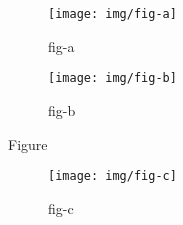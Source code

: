 \begin{figure}[!htb] 
    \begin{subfigure}[!htb]{\textwidth}
        \centering
        \texttt{[image: img/fig-a]}
        \caption{fig-a\\\hspace{\textwidth}}\label{fig:fig-a}
    \end{subfigure}
    \begin{subfigure}[!htb]{\textwidth}
        \centering
        \texttt{[image: img/fig-b]}
        \caption{fig-b\\}\label{fig:fig-b}
    \end{subfigure}
    \caption{Figure}
    \label{fig:fig}
\end{figure}
\begin{figure}[!htb]\ContinuedFloat    
    \begin{subfigure}[!htb]{\textwidth}
        \centering
        \texttt{[image: img/fig-c]}
        \caption{fig-c}\label{fig:fig-c}
    \end{subfigure}
    \renewcommand{\thefigure}{\arabic{figure} (Cont.)}
    \caption{}
    \renewcommand{\thefigure}{\arabic{figure}}
\end{figure} 




